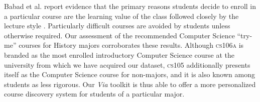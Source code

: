  Babad et al. report evidence that the primary reasons students decide
 to enroll in a particular course are the learning value of the class
 followed closely by the lecture style \cite{Babad2003}. Particularly
 difficult courses are avoided by students unless otherwise
 required. Our assessment of the recommended Computer Science
 ``try-me'' courses for History majors corroborates these
 results. Although \textsc{cs106a} is branded as the most enrolled
 introductory Computer Science course at the university from which we
 have acquired our dataset, \textsc{cs105} additionally presents
 itself as the Computer Science course for non-majors, and it is also
 known among students as less rigorous. Our \textit{Via} toolkit is
 thus able to offer a more personalized course discovery system for
 students of a particular major.
 
